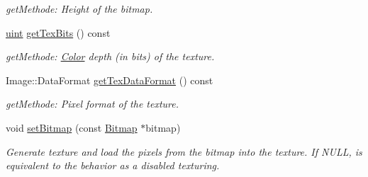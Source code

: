\begin{DoxyCompactItemize}
\begin{DoxyCompactList}\small\item\em getMethode: Height of the bitmap. \item\end{DoxyCompactList}\item 
\hypertarget{class_f2_c_1_1_sprite_base_a1c2bcccea45cbe282628b7c7e43cd93c}{
\hyperlink{namespace_f2_c_a58be2bac9eb3e3c99cb41b6008bf4fae}{uint} \hyperlink{class_f2_c_1_1_sprite_base_a1c2bcccea45cbe282628b7c7e43cd93c}{getTexBits} () const }
\label{class_f2_c_1_1_sprite_base_a1c2bcccea45cbe282628b7c7e43cd93c}

\begin{DoxyCompactList}\small\item\em getMethode: \hyperlink{class_f2_c_1_1_color}{Color} depth (in bits) of the texture. \item\end{DoxyCompactList}\item 
\hypertarget{class_f2_c_1_1_sprite_base_ab5746d99d97e67289b493a6c022fdb58}{
Image::DataFormat \hyperlink{class_f2_c_1_1_sprite_base_ab5746d99d97e67289b493a6c022fdb58}{getTexDataFormat} () const }
\label{class_f2_c_1_1_sprite_base_ab5746d99d97e67289b493a6c022fdb58}

\begin{DoxyCompactList}\small\item\em getMethode: Pixel format of the texture. \item\end{DoxyCompactList}\item 
void \hyperlink{class_f2_c_1_1_sprite_base_a94df734d094880352b1dc517a9332faa}{setBitmap} (const \hyperlink{class_f2_c_1_1_bitmap}{Bitmap} $\ast$bitmap)
\begin{DoxyCompactList}\small\item\em Generate texture and load the pixels from the bitmap into the texture. If NULL, is equivalent to the behavior as a disabled texturing. \item\end{DoxyCompactList}\end{DoxyCompactItemize}
